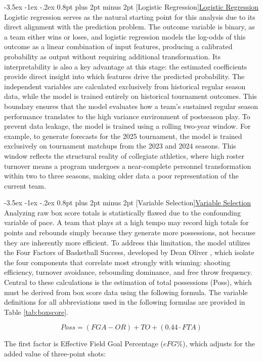 \documentclass[12pt,leqno]{article}\usepackage[pdftex]{graphicx}\usepackage[dvipsnames]{xcolor}
\makeatletter
\renewcommand\subsection{\@startsection {subsection}{1}{\z@}%
{-3.5ex \@plus -1ex \@minus -.2ex}%
{0.8pt plus 2pt minus 2pt}%
{\normalfont}}
\renewcommand\subsubsection{\@startsection {subsubsection}{1}{\z@}%
{-3.5ex \@plus -1ex \@minus -.2ex}%
{0.8pt plus 2pt minus 2pt}%
{\normalfont}}
\newcommand{\usubsection}[1]{\subsection[#1]{\centering\normalfont\underline{#1}}}%
\newcommand{\usubsubsection}[1]{\subsubsection[#1]{\normalfont\normalfont\underline{#1}}}%
\theoremstyle{remark}
\makeatother
\begin{document}
\usubsection{Logistic Regression}
Logistic regression serves as the natural starting point for this analysis due to its direct alignment with the prediction problem. The outcome variable is binary, as a team either wins or loses, and logistic regression models the log-odds of this outcome as a linear combination of input features, producing a calibrated probability as output without requiring additional transformation. Its interpretability is also a key advantage at this stage: the estimated coefficients provide direct insight into which features drive the predicted probability. The independent variables are calculated exclusively from historical regular season data, while the model is trained entirely on historical tournament outcomes. This boundary ensures that the model evaluates how a team's sustained regular season performance translates to the high variance environment of postseason play. To prevent data leakage, the model is trained using a rolling two-year window. For example, to generate forecasts for the 2025 tournament, the model is trained exclusively on tournament matchups from the 2023 and 2024 seasons. This window reflects the structural reality of collegiate athletics, where high roster turnover means a program undergoes a near-complete personnel transformation within two to three seasons, making older data a poor representation of the current team.


\usubsubsection{Variable Selection}
Analyzing raw box score totals is statistically flawed due to the confounding variable of pace. A team that plays at a high tempo may record high totals for points and rebounds simply because they generate more possessions, not because they are inherently more efficient. To address this limitation, the model utilizes the Four Factors of Basketball Success, developed by Dean Oliver \cite{Dean}, which isolate the four components that correlate most strongly with winning: shooting efficiency, turnover avoidance, rebounding dominance, and free throw frequency. Central to these calculations \cite{ff} is the estimation of total possessions (Poss), which must be derived from box score data using the following formula. The variable definitions for all abbreviations used in the following formulas are provided in Table \ref{tab:boxscore}.

\begin{equation}Poss = (FGA - OR) + TO + (0.44 \cdot FTA)\end{equation}

The first factor is Effective Field Goal Percentage ($eFG\%$), which adjusts for the added value of three-point shots:
\end{document}
